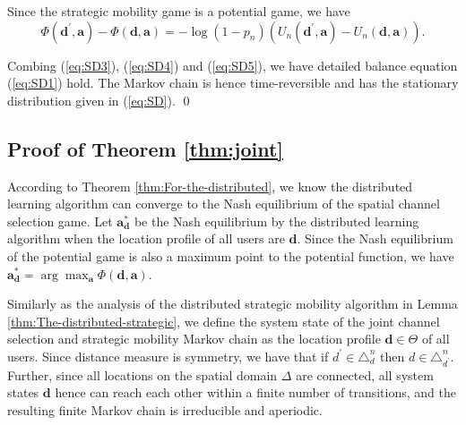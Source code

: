 Since the strategic mobility game is a potential game, we have\begin{equation}
\Phi(\boldsymbol{d}^{'},\boldsymbol{a})-\Phi(\boldsymbol{d},\boldsymbol{a})=-\log(1-p_{n})\left(U_{n}(\boldsymbol{d}^{'},\boldsymbol{a})-U_{n}(\boldsymbol{d},\boldsymbol{a})\right).\label{eq:SD5}\end{equation}

Combing (\ref{eq:SD3}), (\ref{eq:SD4}) and (\ref{eq:SD5}), we have
detailed balance equation (\ref{eq:SD1}) hold. The Markov chain
is hence time-reversible and has the stationary distribution given
in (\ref{eq:SD}). \qed

\subsection{Proof of Theorem \ref{thm:joint}}\label{proof4}
According to Theorem \ref{thm:For-the-distributed}, we know the distributed
learning algorithm can converge to the Nash equilibrium of the spatial channel
selection game. Let $\boldsymbol{a}_{\boldsymbol{d}}^{*}$ be the Nash equilibrium by the distributed
learning algorithm when the location profile of all users are $\boldsymbol{d}$.
Since the Nash equilibrium of the potential game is also a maximum
point to the potential function, we have $\boldsymbol{a}_{\boldsymbol{d}}^{*}=\arg\max_{\boldsymbol{a}}\Phi(\boldsymbol{d},\boldsymbol{a})$.




Similarly as the analysis of the distributed strategic
mobility algorithm in Lemma \ref{thm:The-distributed-strategic},
we define the system state of the joint channel selection and strategic mobility Markov chain as the location profile
$\boldsymbol{d}\in\Theta$ of all users. Since distance measure is symmetry, we
have that if $d^{'}\in\mathcal{\triangle}_{d}^{n}$ then $d\in\mathcal{\triangle}_{d^{'}}^{n}$.
Further, since all locations on the spatial domain $\Delta$ are connected,
all system states $\boldsymbol{d}$ hence can reach each other within a finite
number of transitions, and the resulting finite Markov chain is irreducible
and aperiodic.

